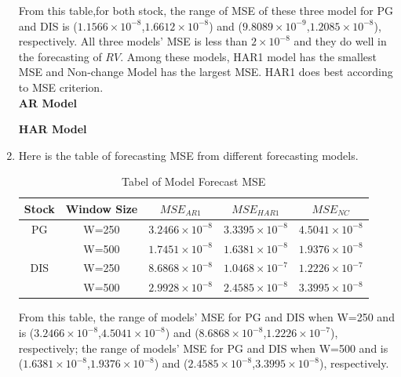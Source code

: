 \documentclass[12pt,letterpaper]{article}
\begin{document}
\begin{enumerate}[label=\textbf{(\Alph*)}]
\begin{table}[ht]
\begin{tabular}{cc ccc}
	\end{tabular}
\end{table} 

From this table,for both stock, the range of MSE of these three model for PG and DIS is ($1.1566\times 10^{-8}$,$1.6612\times 10^{-8}$) and ($9.8089\times 10^{-9}$,$1.2085\times 10^{-8}$), respectively. All three models' MSE is less than $2\times10^{-8}$ and they do well in the forecasting of $RV$. Among these models, HAR1 model has the smallest MSE and Non-change Model has the largest MSE. HAR1 does best according to MSE criterion.\\


\textbf{AR Model} 

\textbf{HAR Model} 


\item 
Here is the table of forecasting MSE from different forecasting models.
\begin{table}[ht]
	\footnotesize
	\caption{Tabel of Model Forecast MSE}
	\vspace{1mm}
	\centering %
	\begin{tabular}{ccccc} %
		
		\hline\hline %
		Stock&Window Size&$MSE_{AR1}$& $MSE_{HAR1}$& $MSE_{NC}$\\  %
		\hline %
	    PG&W=250&$3.2466 \times10^{-8}$&$3.3395\times 10^{-8}$&$4.5041\times10^{-8}$\\ 
	    
	    &W=500&$1.7451\times10^{-8}$&$1.6381\times 10^{-8}$&$1.9376\times10^{-8}$\\ 
	    \hline
	    	
		DIS&W=250&$8.6868\times 10^{-8}$&$1.0468\times 10^{-7}$&$1.2226\times 10^{-7}$\\  %
		 
		
		&W=500&$2.9928\times 10^{-8}$&$2.4585\times 10^{-8}$&$3.3995\times 10^{-8}$\\  %
		\hline %
		
	\end{tabular}
\end{table} 


From this table, the range of models' MSE for PG and DIS when W=250 and is ($3.2466\times 10^{-8}$,$4.5041\times 10^{-8}$) and ($8.6868\times 10^{-8}$,$1.2226 \times 10^{-7}$), respectively; the range of models' MSE for PG and DIS when W=500 and is ($1.6381\times 10^{-8}$,$1.9376\times 10^{-8}$) and ($2.4585\times 10^{-8}$,$3.3995 \times 10^{-8}$), respectively. 


\end{enumerate}
\end{document}
